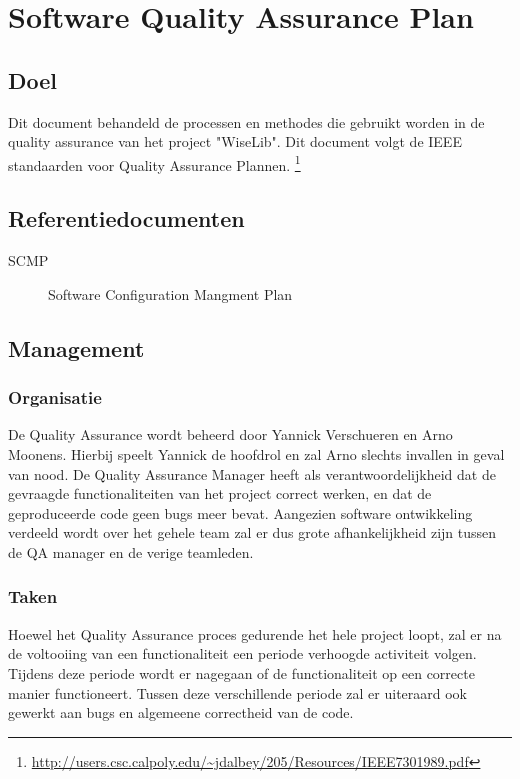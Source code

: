 \section{Software Quality Assurance Plan}
\label{sec:SQAP}
\subsection{Doel}

Dit document behandeld de processen en methodes die gebruikt worden in de quality assurance van het project "WiseLib". Dit document volgt de IEEE standaarden voor Quality Assurance Plannen.
\footnote{\url{http://users.csc.calpoly.edu/~jdalbey/205/Resources/IEEE7301989.pdf}}


\subsection{Referentiedocumenten}

\begin{description}
\item [SCMP] Software Configuration Mangment Plan
\end{description}

\subsection{Management}

\subsubsection{Organisatie}

De Quality Assurance wordt beheerd door Yannick Verschueren en Arno Moonens. Hierbij speelt Yannick de hoofdrol en zal Arno slechts invallen in geval van nood. De Quality Assurance Manager heeft als verantwoordelijkheid dat de gevraagde functionaliteiten van het project correct werken, en dat de geproduceerde code geen bugs meer bevat. Aangezien software ontwikkeling verdeeld wordt over het gehele team zal er dus grote afhankelijkheid zijn tussen de QA manager en de verige teamleden.

\subsubsection{Taken}

Hoewel het Quality Assurance proces gedurende het hele project loopt, zal er na de voltooiing van een functionaliteit een periode verhoogde activiteit volgen. Tijdens deze periode wordt er nagegaan of de functionaliteit op een correcte manier functioneert.
Tussen deze verschillende periode zal er uiteraard ook gewerkt aan bugs en algemeene correctheid van de code.

